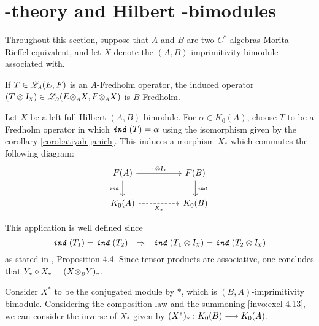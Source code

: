 \section[\texorpdfstring{\ensuremath{K}}{K}-theory and Hilbert \texorpdfstring{\ensuremath{C^*}}{C*}-bimodules]{\texorpdfstring{}{K}-theory and Hilbert \texorpdfstring{}{C*}-bimodules}

Throughout this section, suppose that $A$ and $B$ are two $C^*$-algebras Morita-Rieffel equivalent, and let $X$ denote the $(A,B)$-imprimitivity bimodule associated with.

\begin{invocacao}
	\label{invocacao:exel 4.3}
	If $T\in \sub\adj{A}(E,F)$ is an $A$-Fredholm operator, the induced operator $(T\otimes \sub\Id{X})\in \sub\adj{B}(E\sub\otimes{A} X, F\sub\otimes A X)$ is $B$-Fredholm.
\end{invocacao}

\begin{definicao}
	Let $X$ be a left-full Hilbert $(A,B)$-bimodule. For $\alpha\in K_0(A)$, choose $T$ to be a Fredholm operator in which $\texttt{\textit{ind}}\,(T)=\alpha$ using the isomorphism given by the corollary \ref{corol:atiyah-janich}. This induces a morphism $X_*$ which commutes the following diagram:
	\begin{equation*}
		\begin{tikzcd}
		F(A) \arrow[d, "\ind"'] \arrow[rr, "\,\cdot\, \otimes \sub\Id X"] &  & F(B) \arrow[d, "\ind"] \\
		K_0(A) \arrow[rr, "X_*"', dashed]                            &  & K_0(B)                
		\end{tikzcd}
	\end{equation*}
\end{definicao}

This application is well defined since 
\begin{equation*}
	\ind(T_1)=\ind(T_2) \To \ind(T_1\otimes \sub\Id{X}) = \ind(T_2\otimes \sub\Id{X})
\end{equation*}
as stated in \cite{exel7fredholm}, Proposition 4.4. Since tensor products are associative, one concludes that $Y_* \circ X_* = (X \sub\otimes B Y)_*$. 

Consider $X^*$ to be the conjugated module by $*$, which is $(B,A)$-imprimitivity bimodule. Considering the composition law and the summoning \ref{invo:exel 4.13}, we can consider the inverse of $X_*$ given by $(X^*)_*: K_0(B) \longrightarrow K_0(A)$. 

